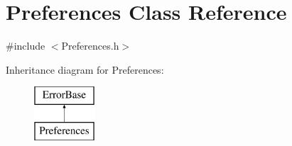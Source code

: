 \hypertarget{classPreferences}{
\section{Preferences Class Reference}
\label{classPreferences}
}


{\ttfamily \#include $<$Preferences.h$>$}

Inheritance diagram for Preferences:\begin{figure}[H]
\begin{center}
\leavevmode
\includegraphics[height=2.000000cm]{classPreferences}
\end{center}
\end{figure}
